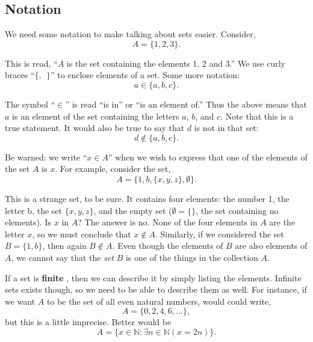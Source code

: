\documentclass[10pt,]{book}
\newcommand{\terminology}[1]{\textbf{#1}}
\theoremstyle{plain}
\theoremstyle{definition}
\theoremstyle{definition}
\theoremstyle{definition}
\def\N{\mathbb N}
\def\st{:}
\begin{document}
\subsection[Notation]{Notation}\label{subsec_notation}

      We need some notation to make talking about sets easier. Consider,
      \begin{equation*}
        A = \{1, 2, 3\}.
      \end{equation*}
\par

      This is read, ``\(A\) is the set containing the elements 1, 2 and 3.'' We use curly braces ``\(\{,~~ \}\)'' to enclose elements of a set. Some more notation:
      \begin{equation*}
        a \in \{a, b, c\}.
      \end{equation*}
\par

      The symbol ``\(\in\)'' is read ``is in'' or ``is an element of.'' Thus the above means that \(a\) is an element of the set containing the letters \(a\), \(b\), and \(c\). Note that this is a true statement. It would also
      be true to say that \(d\) is not in that set:
      \begin{equation*}
        d \not\in \{a, b, c\}.
      \end{equation*}
\par

      Be warned: we write ``\(x \in A\)'' when we wish to express that one of the elements of the set \(A\) is \(x\). For example, consider the set,
      \begin{equation*}
        A = \{1, b, \{x, y, z\}, \emptyset\}.
      \end{equation*}
\par

      This is a strange set, to be sure. It contains four elements: the number 1, the letter b, the set \(\{x,y,z\}\), and the empty set (\(\emptyset = \{ \}\), the set containing no elements). Is \(x\) in \(A\)? The answer is no. None of
      the four elements in \(A\) are the letter \(x\), so we must conclude that \(x \notin A\). Similarly, if we considered the set \(B = \{1,b\}\), then again \(B \notin A\). Even though the elements of \(B\) are also elements of \(A\),
      we cannot say that the \emph{set} \(B\) is one of the things in the collection \(A\).
\par

      If a set is
      \terminology{finite}
      , then we can describe it by simply listing the elements. Infinite sets exists though, so we need to be able to describe them as well. For instance, if we want \(A\) to be the set of all even natural numbers,
      would could write,
      \begin{equation*}
        A = \{0, 2, 4, 6, \ldots\},
      \end{equation*}
      but this is a little imprecise. Better would be
      \begin{equation*}
        A = \{x \in \N \st \exists n\in \N ( x = 2 n)\}.
      \end{equation*}
\par
\end{document}
